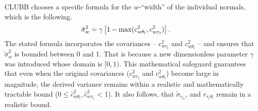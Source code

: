 \gls{CLUBB} chooses a specific formula for the $w$-\enquote{width} of the individual normals,
which is the following.
\begin{align}
    \label{eq:sigma_tilde_w_restricted}
    {\tilde{\sigma}_w}^2
    &= \gamma \left[1 - \max(c_{w \theta_l}^2, c_{w r_t}^2) \right].
\end{align}
The stated formula incorporates the covariances
-- $c_{w r_t}^2$ and $c_{w \theta_l}^2$ --
and ensures that $\tilde{\sigma}_w^2$ is bounded between 0 and 1.
That is because a new dimensionless parameter $\gamma$ was introduced
whose domain is $[0, 1)$.
This mathematical safeguard guarantees
that even when the original covariances ($c_{w r_t}^2$ and $c_{w \theta_l}^2$)
become large in magnitude,
the derived variance remains within a realistic and mathematically tractable bound
($0 \leq \widehat{c}_{w \theta_l}^2, \widehat{c}_{w r_t}^2$ < 1).
It also follows, that $\tilde{\sigma}_{r_{ti}}$, and $r_{r_t \theta_l}$ remain in a realistic bound.